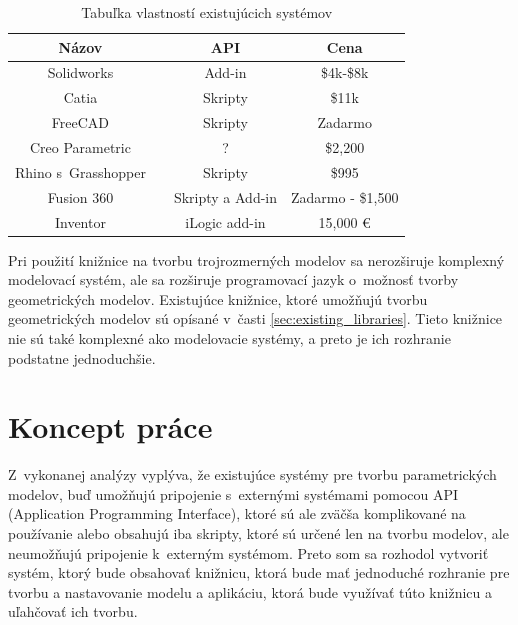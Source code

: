 \begin{table}[H]
\centering
\begin{tabular}{ |c|c|c|c| }
 \hline
 Názov &  & API & Cena \\
 \hline
 \hline
 Solidworks &  & Add-in & \$4k-\$8k \\ 
  \hline
 Catia &  & Skripty & \$11k \\  
  \hline
 FreeCAD &  & Skripty & Zadarmo \\  
  \hline
 Creo Parametric &  & ? &  \$2,200 \\
  \hline
 Rhino s~Grasshopper &   & Skripty & \$995 \\
  \hline
 Fusion 360 & & Skripty a Add-in & Zadarmo - \$1,500 \\
  \hline
 Inventor &  & iLogic add-in & 15,000 \euro  \\
  \hline
\end{tabular}
\caption{Tabuľka vlastností existujúcich systémov}
 \label{tab:systemsAndLibs}
\end{table}




Pri použití knižnice na tvorbu trojrozmerných modelov sa nerozširuje komplexný modelovací systém, ale sa rozširuje programovací jazyk o~možnosť tvorby geometrických modelov. Existujúce knižnice, ktoré umožňujú tvorbu geometrických modelov sú opísané v~časti \ref{sec:existing_libraries}.
Tieto knižnice nie sú také komplexné ako modelovacie systémy, a preto je ich rozhranie podstatne jednoduchšie.







\section{Koncept práce}
Z~vykonanej analýzy vyplýva, že existujúce systémy pre tvorbu parametrických modelov, buď umožňujú pripojenie s~externými systémami pomocou API (Application Programming Interface), ktoré sú ale zväčša komplikované na používanie alebo obsahujú iba skripty, ktoré sú určené len na tvorbu modelov, ale neumožňujú pripojenie k~externým systémom. Preto som sa rozhodol vytvoriť systém, ktorý bude obsahovať knižnicu, ktorá bude mať jednoduché rozhranie pre tvorbu a nastavovanie modelu a aplikáciu, ktorá bude využívať túto knižnicu a uľahčovať ich tvorbu. 



